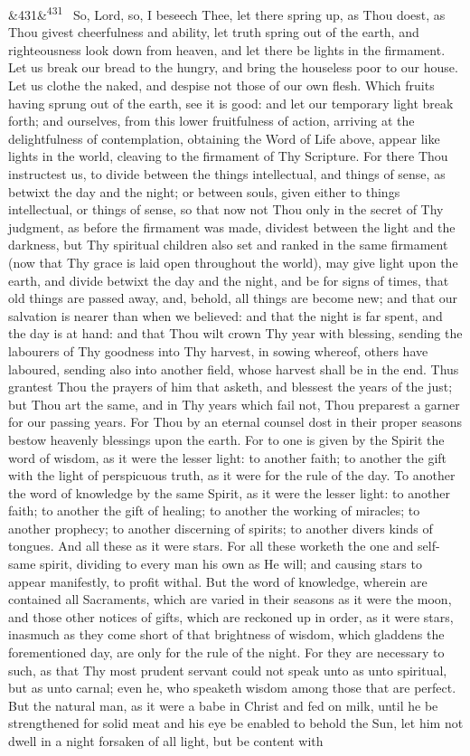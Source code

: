 \documentclass[12pt]{article}
\newcommand{\para}[1][]{\par\noindent\ifx&#1&\else\textsuperscript{\footnotesize #1}~\fi}
\begin{document}
\para[431] So, Lord, so, I beseech Thee, let there spring up, as Thou doest, as Thou givest cheerfulness and ability, let truth spring out of the earth, and righteousness look down from heaven, and let there be lights in the firmament. Let us break our bread to the hungry, and bring the houseless poor to our house. Let us clothe the naked, and despise not those of our own flesh. Which fruits having sprung out of the earth, see it is good: and let our temporary light break forth; and ourselves, from this lower fruitfulness of action, arriving at the delightfulness of contemplation, obtaining the Word of Life above, appear like lights in the world, cleaving to the firmament of Thy Scripture. For there Thou instructest us, to divide between the things intellectual, and things of sense, as betwixt the day and the night; or between souls, given either to things intellectual, or things of sense, so that now not Thou only in the secret of Thy judgment, as before the firmament was made, dividest between the light and the darkness, but Thy spiritual children also set and ranked in the same firmament (now that Thy grace is laid open throughout the world), may give light upon the earth, and divide betwixt the day and the night, and be for signs of times, that old things are passed away, and, behold, all things are become new; and that our salvation is nearer than when we believed: and that the night is far spent, and the day is at hand: and that Thou wilt crown Thy year with blessing, sending the labourers of Thy goodness into Thy harvest, in sowing whereof, others have laboured, sending also into another field, whose harvest shall be in the end. Thus grantest Thou the prayers of him that asketh, and blessest the years of the just; but Thou art the same, and in Thy years which fail not, Thou preparest a garner for our passing years. For Thou by an eternal counsel dost in their proper seasons bestow heavenly blessings upon the earth. For to one is given by the Spirit the word of wisdom, as it were the lesser light: to another faith; to another the gift with the light of perspicuous truth, as it were for the rule of the day. To another the word of knowledge by the same Spirit, as it were the lesser light: to another faith; to another the gift of healing; to another the working of miracles; to another prophecy; to another discerning of spirits; to another divers kinds of tongues. And all these as it were stars. For all these worketh the one and self-same spirit, dividing to every man his own as He will; and causing stars to appear manifestly, to profit withal. But the word of knowledge, wherein are contained all Sacraments, which are varied in their seasons as it were the moon, and those other notices of gifts, which are reckoned up in order, as it were stars, inasmuch as they come short of that brightness of wisdom, which gladdens the forementioned day, are only for the rule of the night. For they are necessary to such, as that Thy most prudent servant could not speak unto as unto spiritual, but as unto carnal; even he, who speaketh wisdom among those that are perfect. But the natural man, as it were a babe in Christ and fed on milk, until he be strengthened for solid meat and his eye be enabled to behold the Sun, let him not dwell in a night forsaken of all light, but be content with 
\end{document}
